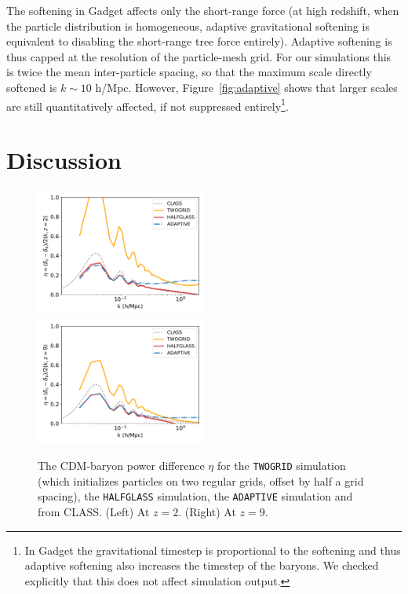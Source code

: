 \documentclass[a4paper,11pt]{article}
\begin{document}
The softening in Gadget affects only the short-range force (at high redshift, when the particle distribution is homogeneous, adaptive gravitational softening is equivalent to disabling the short-range tree force entirely). Adaptive softening is thus capped at the resolution of the particle-mesh grid. For our simulations this is twice the mean inter-particle spacing, so that the maximum scale directly softened is $k \sim 10$ h/Mpc. However, Figure~\ref{fig:adaptive} shows that larger scales are still quantitatively affected, if not suppressed entirely\footnote{In Gadget the gravitational timestep is proportional to the softening and thus adaptive softening also increases the timestep of the baryons. We checked explicitly that this does not affect simulation output.}.


\section{Discussion}
\label{sec:explanation}

\begin{figure}
\includegraphics[width=0.5\textwidth]{plots/halfglass_2_eta.pdf}
\includegraphics[width=0.5\textwidth]{plots/halfglass_9_eta.pdf}
\caption{The CDM-baryon power difference $\eta$ for the \texttt{TWOGRID} simulation (which initializes particles on two regular grids, offset by half a grid spacing), the \texttt{HALFGLASS} simulation, the \texttt{ADAPTIVE} simulation and from CLASS. (Left) At $z=2$. (Right) At $z=9$.
}
\label{fig:eta}
\end{figure}
\end{document}
